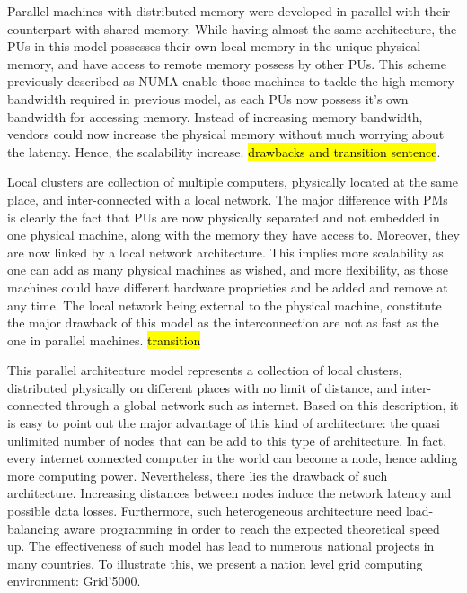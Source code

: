 \begin{description}
Parallel machines with distributed memory were developed in parallel with their counterpart with shared memory. While having almost the same architecture, the PUs in this model possesses their own local memory in the unique physical memory, and have access to remote memory possess by other PUs. This scheme previously described as NUMA enable those machines to tackle the high memory bandwidth required in previous model, as each PUs now possess it's own bandwidth for accessing memory. Instead of increasing memory bandwidth, vendors could now increase the physical memory without much worrying about the latency. Hence, the scalability increase. \hl{drawbacks and transition sentence}.


\item[Local clusters (LC)] Local clusters are collection of multiple computers, physically located at the same place, and inter-connected with a local network. The major difference with PMs is clearly the fact that PUs are now physically separated and not embedded in one physical machine, along with the memory they have access to. Moreover, they are now linked by a local network architecture. This implies more scalability as one can add as many physical machines as wished, and more flexibility, as those machines could have different hardware proprieties and be added and remove at any time. The local network being external to the physical machine, constitute the major drawback of this model as the interconnection are not as fast as the one in parallel machines. \hl{transition} 


\item [Distributed clusters or grids (DC)] This parallel architecture model represents a collection of local clusters, distributed physically on different places with no limit of distance, and inter-connected through a global network such as internet. Based on this description, it is easy to point out the major advantage of this kind of architecture: the quasi unlimited number of nodes that can be add to this type of architecture. In fact, every internet connected computer in the world can become a node, hence adding more computing power. Nevertheless, there lies the drawback of such architecture. Increasing distances between nodes induce the network latency and possible data losses. Furthermore, such heterogeneous architecture need load-balancing aware programming in order to reach the expected theoretical speed up. The effectiveness of such model has lead to numerous national projects in many countries. To illustrate this, we present a nation level grid computing environment: Grid'5000.


\end{description}



